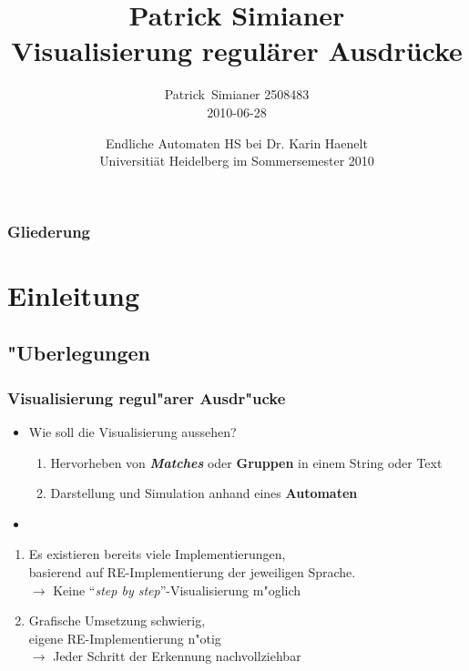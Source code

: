 \documentclass[ignorenonframetext]{beamer}
\title[regexvis]{Patrick Simianer\\ Visualisierung regulärer Ausdrücke}
\author{Patrick~Simianer \tiny 2508483\\\normalsize 2010-06-28}
\date{Endliche Automaten HS bei Dr. Karin Haenelt\\ Universitiät Heidelberg im Sommersemester 2010}
\begin{document}
\frame[plain]{\titlepage}



\begin{frame}[plain]
    \frametitle{Gliederung}
    \tableofcontents
\end{frame}



\section{Einleitung}


\subsection{"Uberlegungen}
\begin{frame}
    \frametitle{Visualisierung regul"arer Ausdr"ucke}
	
	\begin{itemize}
        \item[] Wie soll die Visualisierung aussehen?
        \begin{enumerate}
            \item Hervorheben von \textit{\textbf{Matches}} oder \textbf{Gruppen} in einem String oder Text
            \item Darstellung und Simulation anhand eines \textbf{Automaten}
        \end{enumerate}
        \item[]
	\end{itemize}
    \begin{enumerate}
        \item Es existieren bereits viele Implementierungen, \\ basierend auf RE-Implementierung der jeweiligen Sprache.\\ $\rightarrow$ Keine "`\textit{step by step}"'-Visualisierung m"oglich
        \item Grafische Umsetzung schwierig,\\ eigene RE-Implementierung n"otig\\ $\rightarrow$ Jeder Schritt der Erkennung nachvollziehbar
    \end{enumerate}
\end{frame}
\end{document}
